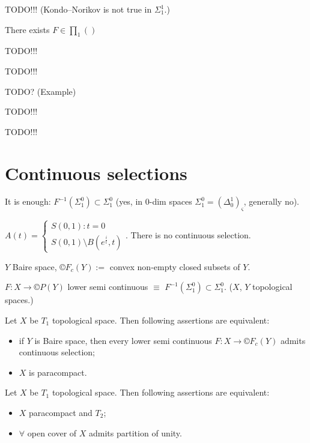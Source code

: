 \documentclass[12pt]{article}					%
\begin{document}
TODO!!! (Kondo–Norikov is not true in $Σ_1^1$.)

\begin{priklad}
	There exists $F \in ∏_1()$

	TODO!!!
\end{priklad}

TODO!!!


TODO? (Example)

TODO!!!


TODO!!!

\section{Continuous selections}
\begin{poznamka}
	It is enough: $F^{-1}(Σ_1^0) \subset Σ_1^0$ (yes, in 0-dim spaces $Σ_1^0 = (Δ_0^1)_ς$, generally no).
\end{poznamka}

\begin{priklad}
	$A(t) = \begin{cases} S(0, 1): t = 0 \\ S(0, 1) \setminus B(e^{\frac{i}{t}}, t)\end{cases}$. There is no continuous selection.
\end{priklad}

\begin{poznamka}[Notation]
	$Y$ Baire space, $©F_c(Y) :=$ convex non-empty closed subsets of $Y$.

	$F: X \rightarrow ©P(Y)$ lower semi continuous $≡$ $F^{-1}(Σ_1^0) \subset Σ_1^0$. ($X$, $Y$ topological spaces.)
\end{poznamka}

\begin{poznamka}[E. Michael]
	Let $X$ be $T_1$ topological space. Then following assertions are equivalent:
	\begin{itemize}
		\item if $Y$ is Baire space, then every lower semi continuous $F: X \rightarrow ©F_c(Y)$ admits continuous selection;
		\item $X$ is paracompact.
	\end{itemize}
\end{poznamka}

\begin{poznamka}
	Let $X$ be $T_1$ topological space. Then following assertions are equivalent:
	\begin{itemize}
		\item $X$ paracompact and $T_2$;
		\item $\forall$ open cover of $X$ admits partition of unity.
	\end{itemize}
\end{poznamka}
\end{document}
